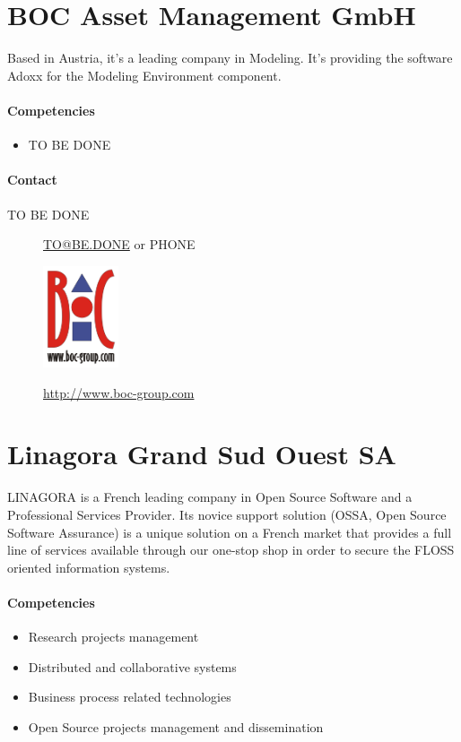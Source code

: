 \documentclass{learnpad}
\begin{document}
\section{BOC Asset Management GmbH}
Based in Austria, it's a leading company in Modeling.  It's providing the
software Adoxx for the Modeling Environment component.

\paragraph{Competencies}
\begin{itemize}
	\item TO BE DONE
\end{itemize}

\paragraph{Contact}
\begin{description}
	\item[TO BE DONE] \href{mailto:TO@BE.DONE}{TO@BE.DONE} or PHONE
\end{description}

\begin{figure}[!htp]
	\centering
	\includegraphics[width=6em,keepaspectratio]{figures/boc-group.png}\par
	\url{http://www.boc-group.com}
\end{figure}

\section{Linagora Grand Sud Ouest SA}
LINAGORA is a French leading company in Open Source Software and a Professional
Services Provider. Its novice support solution (OSSA, Open Source Software
Assurance) is a unique solution on a French market that provides a full line of
services available through our one-stop shop in order to secure the FLOSS
oriented information systems.

\paragraph{Competencies}
\begin{itemize}
	\item Research projects management
	\item Distributed and collaborative systems
	\item Business process related technologies
	\item Open Source projects management and dissemination
\end{itemize}
\end{document}
